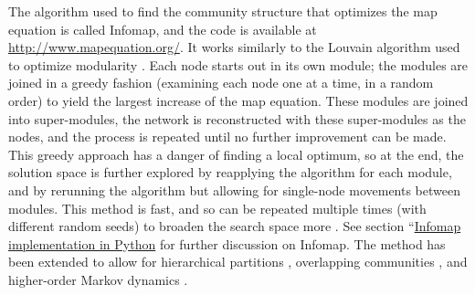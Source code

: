 The algorithm used to find the community structure that optimizes the
map equation is called Infomap, and the code is available at
\url{http://www.mapequation.org/}. It works similarly to the Louvain
algorithm used to optimize modularity \autocite{blondel_fast_2008}. Each
node starts out in its own module; the modules are joined in a greedy
fashion (examining each node one at a time, in a random order) to yield
the largest increase of the map equation. These modules are joined into
super-modules, the network is reconstructed with these super-modules as
the nodes, and the process is repeated until no further improvement can
be made. This greedy approach has a danger of finding a local optimum,
so at the end, the solution space is further explored by reapplying the
algorithm for each module, and by rerunning the algorithm but allowing
for single-node movements between modules. This method is fast, and so
can be repeated multiple times (with different random seeds) to broaden
the search space more
\autocites{rosvall_maps_2008}{rosvall_map_2010}{rosvall_multilevel_2011}.
See section ``\protect\hyperlink{pyinfomap}{Infomap implementation in
Python} for further discussion on Infomap. The method has been extended
to allow for hierarchical partitions \autocite{rosvall_multilevel_2011},
overlapping communities \autocite{viamontes_esquivel_compression_2011},
and higher-order Markov dynamics \autocite{rosvall_memory_2014}.

